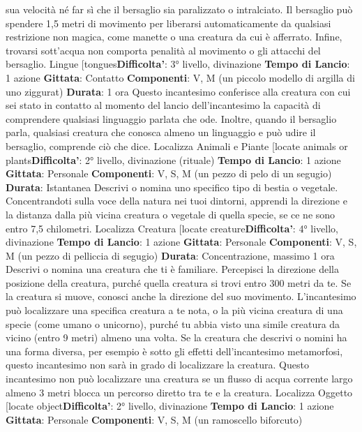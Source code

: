 \begin{multicols}{2}
sua velocità né far sì che il bersaglio sia paralizzato o
intralciato.
Il bersaglio può spendere 1,5 metri di movimento per
liberarsi automaticamente da qualsiasi restrizione non
magica, come manette o una creatura da cui è
afferrato. Infine, trovarsi sott’acqua non comporta
penalità al movimento o gli attacchi del bersaglio.
Lingue
[tongues\textbf{Difficolta'}:
3° livello, divinazione
\textbf{Tempo di Lancio}: 1 azione
\textbf{Gittata}: Contatto
\textbf{Componenti}: V, M (un piccolo modello di argilla di uno
ziggurat)
\textbf{Durata}: 1 ora
Questo incantesimo conferisce alla creatura con cui sei
stato in contatto al momento del lancio dell’incantesimo
la capacità di comprendere qualsiasi linguaggio parlata
che ode. Inoltre, quando il bersaglio parla, qualsiasi
creatura che conosca almeno un linguaggio e può udire
il bersaglio, comprende ciò che dice.
Localizza Animali e Piante
[locate animals or plants\textbf{Difficolta'}:
2° livello, divinazione (rituale)
\textbf{Tempo di Lancio}: 1 azione
\textbf{Gittata}: Personale
\textbf{Componenti}: V, S, M (un pezzo di pelo di un segugio)
\textbf{Durata}: Istantanea
Descrivi o nomina uno specifico tipo di bestia o
vegetale. Concentrandoti sulla voce della natura nei
tuoi dintorni, apprendi la direzione e la distanza dalla
più vicina creatura o vegetale di quella specie, se ce ne
sono entro 7,5 chilometri.
Localizza Creatura
[locate creature\textbf{Difficolta'}:
4° livello, divinazione
\textbf{Tempo di Lancio}: 1 azione
\textbf{Gittata}: Personale
\textbf{Componenti}: V, S, M (un pezzo di pelliccia di segugio)
\textbf{Durata}: Concentrazione, massimo 1 ora
Descrivi o nomina una creatura che ti è familiare.
Percepisci la direzione della posizione della creatura,
purché quella creatura si trovi entro 300 metri da te. Se
la creatura si muove, conosci anche la direzione del
suo movimento.
L’incantesimo può localizzare una specifica creatura a
te nota, o la più vicina creatura di una specie (come
umano o unicorno), purché tu abbia visto una simile
creatura da vicino (entro 9 metri) almeno una volta. Se
la creatura che descrivi o nomini ha una forma diversa,
per esempio è sotto gli effetti dell’incantesimo
metamorfosi, questo incantesimo non sarà in grado di
localizzare la creatura.
Questo incantesimo non può localizzare una creatura
se un flusso di acqua corrente largo almeno 3 metri
blocca un percorso diretto tra te e la creatura.
Localizza Oggetto
[locate object\textbf{Difficolta'}:
2° livello, divinazione
\textbf{Tempo di Lancio}: 1 azione
\textbf{Gittata}: Personale
\textbf{Componenti}: V, S, M (un ramoscello biforcuto)

\end{multicols}
